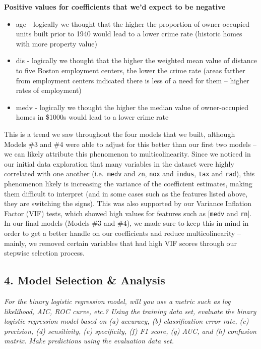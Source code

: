 \documentclass[
]{article}
\providecommand{\tightlist}{%
  \setlength{\itemsep}{0pt}\setlength{\parskip}{0pt}}
\begin{document}
\textbf{Positive values for coefficients that we'd expect to be
negative}

\begin{itemize}
\tightlist
\item
  age - logically we thought that the higher the proportion of
  owner-occupied units built prior to 1940 would lead to a lower crime
  rate (historic homes with more property value)
\item
  dis - logically we thought that the higher the weighted mean value of
  distance to five Boston employment centers, the lower the crime rate
  (areas farther from employment centers indicated there is less of a
  need for them -- higher rates of employment)
\item
  medv - logically we thought the higher the median value of
  owner-occupied homes in \$1000s would lead to a lower crime rate
\end{itemize}

This is a trend we saw throughout the four models that we built,
although Models \#3 and \#4 were able to adjust for this better than our
first two models -- we can likely attribute this phenomenon to
multicolinearity. Since we noticed in our initial data exploration that
many variables in the dataset were highly correlated with one another
(i.e.~\texttt{medv} and \texttt{zn}, \texttt{nox} and \texttt{indus},
\texttt{tax} and \texttt{rad}), this phenomenon likely is increasing the
variance of the coefficient estimates, making them difficult to
interpret (and in some cases such as the features listed above, they are
switching the signs). This was also supported by our Variance Inflation
Factor (VIF) tests, which showed high values for features such as
{[}\texttt{medv} and \texttt{rn}{]}. In our final models (Models \#3 and
\#4), we made sure to keep this in mind in order to get a better handle
on our coefficients and reduce multicolinearity -- mainly, we removed
certain variables that had high VIF scores through our stepwise
selection process.

\hypertarget{model-selection-analysis}{%
\subsection{4. Model Selection \&
Analysis}\label{model-selection-analysis}}

\emph{For the binary logistic regression model, will you use a metric
such as log likelihood, AIC, ROC curve, etc.? Using the training data
set, evaluate the binary logistic regression model based on (a)
accuracy, (b) classification error rate, (c) precision, (d) sensitivity,
(e) specificity, (f) F1 score, (g) AUC, and (h) confusion matrix. Make
predictions using the evaluation data set.}
\end{document}
